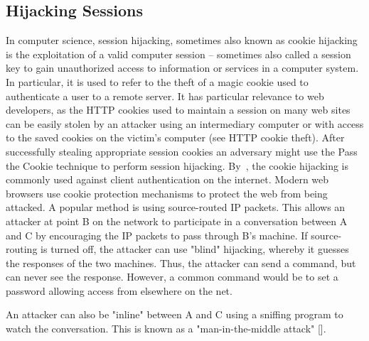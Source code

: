 \subsection{Hijacking Sessions}\label{subsec:hijacking-sessions}
In computer science, session hijacking, sometimes also known as cookie hijacking is the exploitation of a valid computer
session -- sometimes also called a session key to gain unauthorized access to information or services in a computer system.
In particular, it is used to refer to the theft of a magic cookie used to authenticate a user to a remote server.
It has particular relevance to web developers, as the HTTP cookies used to maintain a session on many web sites
can be easily stolen by an attacker using an intermediary computer or with access to the saved cookies on the victim's
computer (see HTTP cookie theft).
After successfully stealing appropriate session cookies an adversary might use the Pass the Cookie technique to perform
session hijacking.
By~\cite{bugliesi2015cookiext}, the cookie hijacking is commonly used against client authentication on the internet.
Modern web browsers use cookie protection mechanisms to protect the web from being attacked.
A popular method is using source-routed IP packets.
This allows an attacker at point B on the network to participate in a conversation between A and C by encouraging the
IP packets to pass through B's machine.
If source-routing is turned off, the attacker can use "blind" hijacking, whereby it guesses the responses of the two
machines.
Thus, the attacker can send a command, but can never see the response.
However, a common command would be to set a password allowing access from elsewhere on the net.

An attacker can also be "inline" between A and C using a sniffing program to watch the conversation.
This is known as a "man-in-the-middle attack" [\cite{callegati2009man}].


